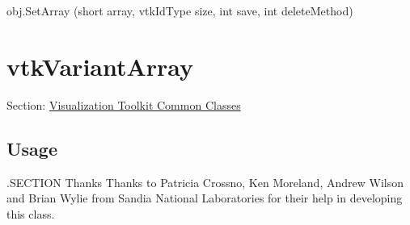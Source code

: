 \begin{DoxyItemize}
\item {\ttfamily obj.\-Set\-Array (short array, vtk\-Id\-Type size, int save, int delete\-Method)}  
\end{DoxyItemize}\hypertarget{vtkcommon_vtkvariantarray}{}\section{vtk\-Variant\-Array}\label{vtkcommon_vtkvariantarray}
Section\-: \hyperlink{sec_vtkcommon}{Visualization Toolkit Common Classes} \hypertarget{vtkwidgets_vtkxyplotwidget_Usage}{}\subsection{Usage}\label{vtkwidgets_vtkxyplotwidget_Usage}
.S\-E\-C\-T\-I\-O\-N Thanks Thanks to Patricia Crossno, Ken Moreland, Andrew Wilson and Brian Wylie from Sandia National Laboratories for their help in developing this class.

